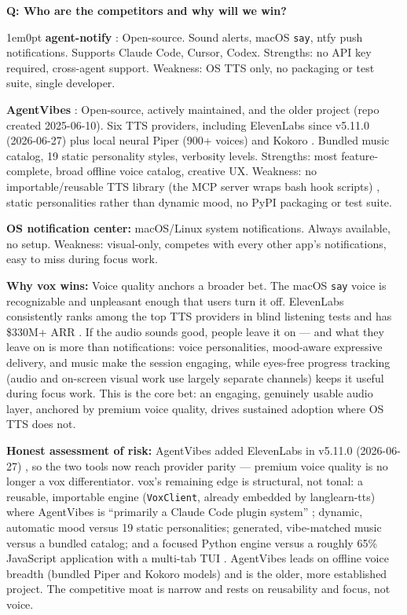\documentclass[11pt,letterpaper]{article}
\newcounter{faqnum}
\newenvironment{faqpair}[1]{%
  \needspace{4\baselineskip}%
  \vspace{0.5em}%
  \refstepcounter{faqnum}%
  \noindent\textbf{\color{SectionBlue}Q\thefaqnum: #1}\par\nopagebreak[4]%
  \vspace{0.2em}%
  \begin{adjustwidth}{1em}{0pt}%
  \setlength{\parindent}{0pt}%
}{%
  \end{adjustwidth}%
  \vspace{0.5em}%
}
\begin{document}
\begin{faqpair}{Who are the competitors and why will we win?}\label{faq:competitive}
  \textbf{agent-notify} \cite{agentnotify2025}: Open-source. Sound alerts,
  macOS \texttt{say}, ntfy push notifications. Supports Claude Code, Cursor,
  Codex. Strengths: no API key required, cross-agent support. Weakness: OS
  TTS only, no packaging or test suite, single developer.

  \textbf{AgentVibes} \cite{agentvibes2025}: Open-source, actively maintained,
  and the older project (repo created 2025-06-10). Six TTS providers, including
  ElevenLabs since v5.11.0 (2026-06-27) plus local neural Piper (900+ voices)
  and Kokoro \cite{agentvibes2026releasenotes,agentvibes2026providers}. Bundled
  music catalog, 19 static personality styles, verbosity levels. Strengths: most
  feature-complete, broad offline voice catalog, creative UX. Weakness: no
  importable/reusable TTS library (the MCP server wraps bash hook scripts)
  \cite{agentvibes2026technicaldeepdive}, static personalities rather than
  dynamic mood, no PyPI packaging or test suite.

  \textbf{OS notification center:} macOS/Linux system notifications. Always
  available, no setup. Weakness: visual-only, competes with every other app's
  notifications, easy to miss during focus work.

  \textbf{Why vox wins:} Voice quality anchors a broader bet. The macOS
  \texttt{say} voice is recognizable and unpleasant enough that users turn it
  off. ElevenLabs consistently ranks among the top TTS providers in blind
  listening tests and has \$330M+ ARR \cite{cnbc2026elevenlabs}. If the audio
  sounds good, people leave it on --- and what they leave on is more than
  notifications: voice personalities, mood-aware expressive delivery, and
  music make the session engaging, while eyes-free progress tracking (audio
  and on-screen visual work use largely separate channels) keeps it useful
  during focus work. This is the core bet: an engaging, genuinely usable audio layer,
  anchored by premium voice quality, drives sustained adoption where OS TTS
  does not.

  \textbf{Honest assessment of risk:} AgentVibes added ElevenLabs in v5.11.0
  (2026-06-27) \cite{agentvibes2026releasenotes}, so the two tools now reach
  provider parity --- premium voice quality is no longer a vox differentiator.
  vox's remaining edge is structural, not tonal: a reusable, importable engine
  (\texttt{VoxClient}, already embedded by langlearn-tts) where AgentVibes is
  ``primarily a Claude Code plugin system''
  \cite{agentvibes2026technicaldeepdive}; dynamic, automatic mood versus 19
  static personalities; generated, vibe-matched music versus a bundled catalog;
  and a focused Python engine versus a roughly 65\% JavaScript application with
  a multi-tab TUI \cite{agentvibes2026github}. AgentVibes leads on offline voice
  breadth (bundled Piper and Kokoro models) and is the older, more established
  project. The competitive moat is narrow and rests on reusability and focus,
  not voice.
\end{faqpair}
\end{document}
